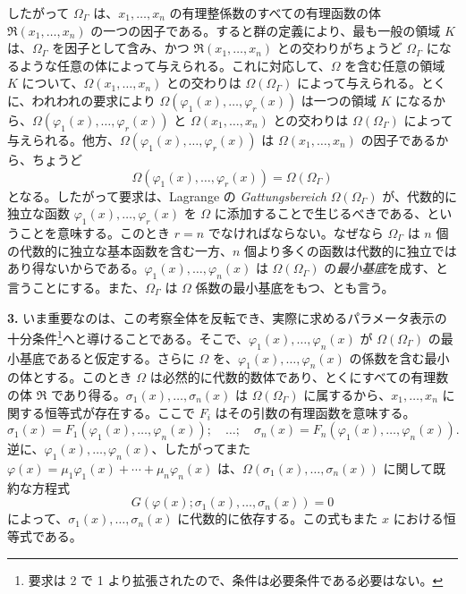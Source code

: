 \documentclass[11pt]{article}
\begin{document}
したがって $\Omega_\Gamma$ は、$x_1,
\ldots,x_n$ の有理整係数のすべての有理函数の体 $\mathfrak R(x_1,
\ldots,x_n)$ の一つの因子である。すると群の定義により、最も一般の領域 $K$ は、$\Omega_\Gamma$ を因子として含み、かつ $\mathfrak R(x_1,
\ldots,x_n)$ との交わりがちょうど $\Omega_\Gamma$ になるような任意の体によって与えられる。これに対応して、$\Omega$ を含む任意の領域 $K$ について、$\Omega(x_1,
\ldots,x_n)$ との交わりは $\Omega(\Omega_\Gamma)$ によって与えられる。とくに、われわれの要求により $\Omega(\varphi_1(x),\ldots,\varphi_r(x))$ は一つの領域 $K$ になるから、$\Omega(\varphi_1(x),\ldots,\varphi_r(x))$ と $\Omega(x_1,
\ldots,x_n)$ との交わりは $\Omega(\Omega_\Gamma)$ によって与えられる。他方、$\Omega(\varphi_1(x),\ldots,\varphi_r(x))$ は $\Omega(x_1,
\ldots,x_n)$ の因子であるから、ちょうど
\[
\Omega(\varphi_1(x),\ldots,\varphi_r(x))=\Omega(\Omega_\Gamma)
\]
となる。したがって要求は、Lagrange の \emph{Gattungsbereich} $\Omega(\Omega_\Gamma)$ が、代数的に独立な函数 $\varphi_1(x),\ldots,\varphi_r(x)$ を $\Omega$ に添加することで生じるべきである、ということを意味する。このとき $r=n$ でなければならない。なぜなら $\Omega_\Gamma$ は $n$ 個の代数的に独立な基本函数を含む一方、$n$ 個より多くの函数は代数的に独立ではあり得ないからである。$\varphi_1(x),\ldots,\varphi_n(x)$ は $\Omega(\Omega_\Gamma)$ の\emph{最小基底}を成す、と言うことにする。また、$\Omega_\Gamma$ は $\Omega$ 係数の最小基底をもつ、とも言う。

\textbf{3.} いま重要なのは、この考察全体を反転でき、実際に求めるパラメータ表示の十分条件\footnote{要求は 2 で 1 より拡張されたので、条件は必要条件である必要はない。}へと導けることである。そこで、$\varphi_1(x),\ldots,\varphi_n(x)$ が $\Omega(\Omega_\Gamma)$ の最小基底であると仮定する。さらに $\Omega$ を、$\varphi_1(x),\ldots,\varphi_n(x)$ の係数を含む最小の体とする。このとき $\Omega$ は必然的に代数的数体であり、とくにすべての有理数の体 $\mathfrak R$ であり得る。$\sigma_1(x),\ldots,\sigma_n(x)$ は $\Omega(\Omega_\Gamma)$ に属するから、$x_1,
\ldots,x_n$ に関する恒等式が存在する。ここで $F_i$ はその引数の有理函数を意味する。
\begin{equation}\tag{5}
\sigma_1(x)=F_1(\varphi_1(x),\ldots,\varphi_n(x));\quad\ldots;\quad
\sigma_n(x)=F_n(\varphi_1(x),\ldots,\varphi_n(x)).
\end{equation}
逆に、$\varphi_1(x),\ldots,\varphi_n(x)$、したがってまた
$\varphi(x)=\mu_1\varphi_1(x)+\cdots+\mu_n\varphi_n(x)$ は、$\Omega(\sigma_1(x),\ldots,\sigma_n(x))$ に関して既約な方程式
\begin{equation}\tag{6}
G(\varphi(x);\sigma_1(x),\ldots,\sigma_n(x))=0
\end{equation}
によって、$\sigma_1(x),\ldots,\sigma_n(x)$ に代数的に依存する。この式もまた $x$ における恒等式である。
\end{document}
